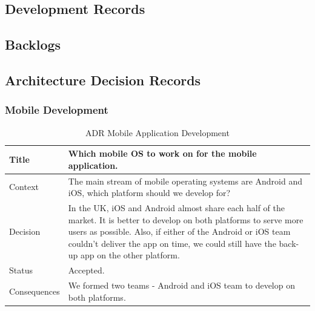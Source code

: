 \documentclass[12pt,a4paper]{article}
\begin{document}
    \begin{appendices}                  
      \section{Development Records}
        \subsection{Backlogs}\label{appendix:backlogs}
          
          
        \subsection{Architecture Decision Records}\label{appendix:Architecture Decision Records}
          \subsubsection{Mobile Development}
            \begin{table}[H]
              \centering
                \begin{tabularx}{\textwidth}{l X}
                  \hline
                  Title & Which mobile OS to work on for the mobile application. \\ \hline
                  Context & The main stream of mobile operating systems are Android and iOS, which platform should we develop for?\\ 
                  Decision & In the UK, iOS and Android almost share each half of the market. It is better to develop on both platforms to serve more users as possible. Also, if either of the Android or iOS team couldn't deliver the app on time, we could still have the back-up app on the other platform. \\ 
                  Status & Accepted.\\ 
                  Consequences & We formed two teams - Android and iOS team to develop on both platforms.  \\                  
                  \hline
                \end{tabularx}
                \caption[Table caption text]{ADR Mobile Application Development}
                \label{table:ADR Mobile Application Development}
            \end{table}


\end{appendices}
\end{document}
